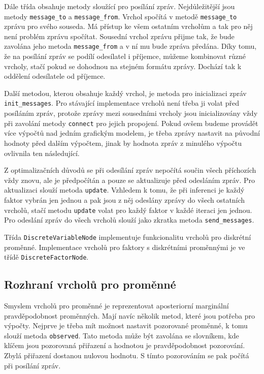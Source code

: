 Dále třída obsahuje metody sloužící pro posílání zpráv.
Nejdůležitější jsou metody \texttt{message\_to} a \texttt{message\_from}.
Vrchol spočítá v metodě \texttt{message\_to} zprávu pro svého souseda.
Má přístup ke všem ostatním vrcholům a tak pro něj není problém zprávu spočítat.
Sousední vrchol zprávu přijme tak, že bude zavolána jeho metoda \texttt{message\_from} a v ní mu bude zpráva předána.
Díky tomu, že na posílání zpráv se podílí odesílatel i příjemce, můžeme kombinovat různé vrcholy, stačí pokud se dohodnou na stejném formátu zprávy.
Dochází tak k oddělení odesílatele od příjemce.

Další metodou, kterou obsahuje každý vrchol, je metoda pro inicializaci zpráv \texttt{init\_messages}. 
Pro stávající implementace vrcholů není třeba ji volat před posíláním zpráv, protože zprávy mezi sousedními vrcholy jsou inicializovány vždy při zavolání metody \texttt{connect} pro jejich propojení.
Pokud ovšem budeme provádět více výpočtů nad jedním grafickým modelem, je třeba zprávy nastavit na původní hodnoty před dalším výpočtem, jinak by hodnota zpráv z minulého výpočtu ovlivnila ten následující.

Z optimalizačních důvodů se při odesílání zpráv nepočítá součin všech příchozích vždy znovu, ale je předpočítán a pouze se aktualizuje před odesláním zpráv.
Pro aktualizaci slouží metoda \texttt{update}.
Vzhledem k tomu, že při inferenci je každý faktor vybrán jen jednou a pak jsou z něj odeslány zprávy do všech ostatních vrcholů, stačí metodu \texttt{update} volat pro každý faktor v každé iteraci jen jednou.
Pro odeslání zpráv do všech vrcholů slouží jako zkratka metoda \texttt{send\_messages}.

Třída \texttt{DiscreteVariableNode} implementuje funkcionalitu vrcholů pro diskrétní proměnné.
Implementace vrcholů pro faktory s diskrétními proměnnými je ve třídě \texttt{DiscreteFactorNode}. 

\subsection{Rozhraní vrcholů pro proměnné}

Smyslem vrcholů pro proměnné je reprezentovat aposteriorní marginální pravděpodobnost proměnných.
Mají navíc několik metod, které jsou potřeba pro výpočty.
Nejprve je třeba mít možnost nastavit pozorované proměnné, k tomu slouží metoda \texttt{observed}.
Tato metoda může být zavolána se slovníkem, kde klíčem jsou pozorovaná přiřazení a hodnotou je pravděpodobnost pozorování.
Zbylá přiřazení dostanou nulovou hodnotu.
S tímto pozorováním se pak počítá při posílání zpráv.


